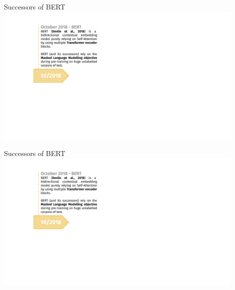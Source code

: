 \begin{frame}[noframenumbering]{Successors of BERT}
\hbox{\hspace{-3em} \includegraphics[width=12cm,page=4]{figure/transfer_learning_timeline4_nlp.pdf}}
\end{frame}
\begin{frame}[noframenumbering]{Successors of BERT}
\hbox{\hspace{-3em} \includegraphics[width=12cm,page=5]{figure/transfer_learning_timeline4_nlp.pdf}}
\end{frame}


